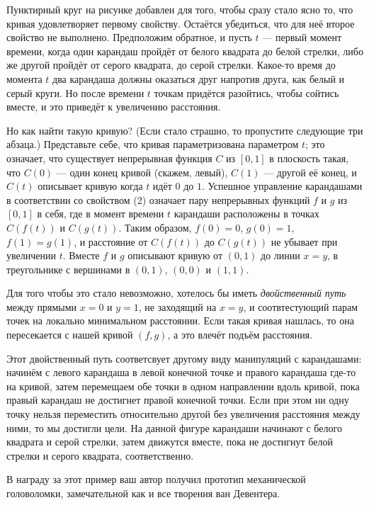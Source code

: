 Пунктирный круг на рисунке добавлен для того, чтобы сразу стало ясно то, что кривая удовлетворяет первому свойству.
Остаётся убедиться, что для неё второе свойство не выполнено.
Предположим обратное, и пусть $t$ --- первый момент времени, когда один карандаш пройдёт от белого квадрата до белой стрелки,
либо же другой пройдёт от серого квадрата, до серой стрелки.
Какое-то время до момента $t$ два карандаша должны оказаться друг напротив друга, как белый и серый круги.
Но после времени $t$ точкам придётся разойтись, чтобы сойтись вместе, и это приведёт к увеличению расстояния.

Но как найти такую кривую?
(Если стало страшно, то пропустите следующие три абзаца.)
Представьте себе, что кривая параметризована параметром $t$;
это означает, что существует непрерывная функция $C$ из $[0, 1]$ в плоскость такая, что $C(0)$ --- один конец кривой (скажем, левый), $C(1)$ --- другой её конец, и $C(t)$ описывает кривую когда $t$ идёт $0$ до $1$.
Успешное управление карандашами в соответствии со свойством (2) означает пару непрерывных функций $f$ и $g$ из $[0,1]$ в себя, где в момент времени $t$ карандаши расположены в точках $C(f(t))$ и $C(g(t))$.
Таким образом, $f (0) = 0$, $g(0) = 1$, $f (1) = g(1)$, и расстояние от $C(f (t))$ до $C(g(t))$ не убывает при увеличении $t$.
Вместе $f$ и $g$ описывают кривую от $(0,1)$ до линии $x = y$, в треугольнике с вершинами в $(0,1)$, $(0,0)$ и $(1,1)$.

Для того чтобы это стало невозможно, хотелось бы иметь \emph{двойственный путь} между прямыми $x = 0$ и $y = 1$, не заходящий на $x = y$, и соотвтестующий парам точек на локально минимальном расстоянии.
Если такая кривая нашлась, то она пересекается с нашей кривой $(f, g)$, а это влечёт подъём расстояния.

Этот двойственный путь соответсвует другому виду манипуляций с карандашами:
начинём с левого карандаша в левой конечной точке и правого карандаша где-то на кривой,
затем перемещаем обе точки в одном направлении вдоль кривой, пока правый карандаш не достигнет правой конечной точки.
Если при этом ни одну точку нельзя переместить относительно другой без увеличения расстояния между ними, то мы достигли цели.
На данной фигуре карандаши начинают с белого квадрата и серой стрелки, затем движутся вместе, пока не достигнут белой стрелки и серого квадрата, соответственно.

В награду за этот пример ваш автор получил прототип механической головоломки, замечательной как и все творения ван Девентера.


